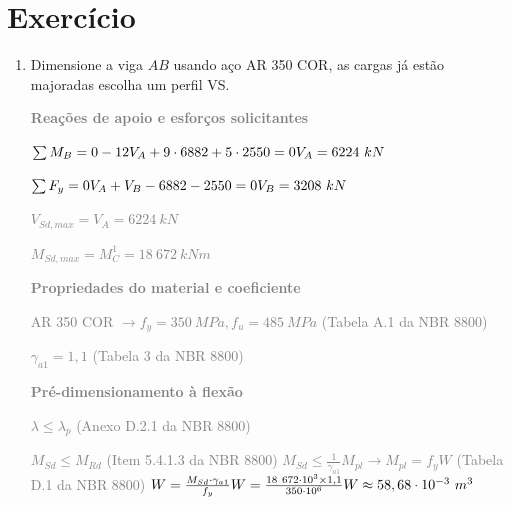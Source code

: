 \cabecalho

\section*{Exercício}


\begin{enumerate}
    \item Dimensione a viga $AB$ usando aço AR 350 COR, as cargas já estão majoradas escolha um perfil VS. %
    
    

    \textcolor{gray}{\textbf{Reações de apoio e esforços solicitantes}}

    \textcolor{gray}{$\sum M_B = 0 \newline -12 V_A + 9 \cdot 6882 + 5 \cdot 2550 = 0 \newline V_A = 6224 \ kN$}

    \textcolor{gray}{$\sum F_y = 0 \newline V_A + V_B - 6882 - 2550 = 0 \newline V_B = 3208 \ kN$}

    

    \textcolor{gray}{$V_{Sd,max} = V_A = 6224 \ kN$}

    



    \textcolor{gray}{$M_{Sd,max} = M_C^1 = 18 \ 672 \ kNm$}


    \textcolor{gray}{\textbf{Propriedades do material e coeficiente}}

    \textcolor{gray}{AR 350 COR $\to f_y = 350 \ MPa, f_u = 485 \ MPa$ (Tabela A.1 da NBR 8800)}

    \textcolor{gray}{$\gamma_{a1} = 1,1$ (Tabela 3 da NBR 8800)}

    \textcolor{gray}{\textbf{Pré-dimensionamento à flexão}}

    \textcolor{gray}{$\lambda \leq \lambda_p$ (Anexo D.2.1 da NBR 8800)} 

    \textcolor{gray}{$M_{Sd} \leq M_{Rd}$ (Item 5.4.1.3 da NBR 8800) \newline $M_{Sd} \leq \frac{1}{\gamma_{a1}} M_{pl} \to M_{pl} = f_y W$ (Tabela D.1 da NBR 8800) \newline $W = \frac{M_{Sd} \cdot \gamma_{a1}}{f_y} \newline W = \frac{18\ 672 \cdot 10^3 \times 1,1}{350 \cdot 10^6} \newline W \approx 58,68 \cdot 10^{-3} \ m^3$}


\end{enumerate}
